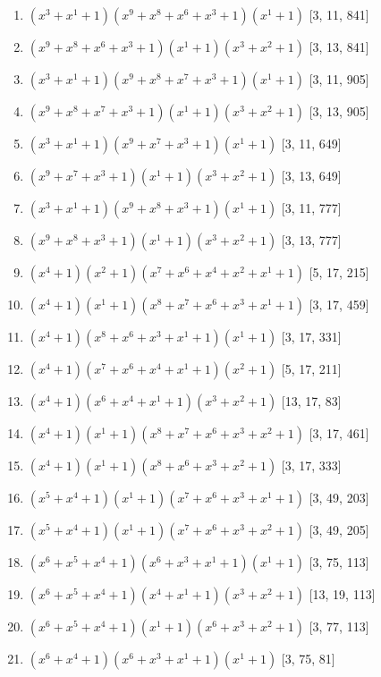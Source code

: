\documentclass[10pt,twocolumn]{article}
\begin{document}
\begin{enumerate}
\item $(x^{3} + x^{1} + 1)(x^{9} + x^{8} + x^{6} + x^{3} + 1)(x^{1} + 1)$  [3, 11, 841]
\item $(x^{9} + x^{8} + x^{6} + x^{3} + 1)(x^{1} + 1)(x^{3} + x^{2} + 1)$  [3, 13, 841]
\item $(x^{3} + x^{1} + 1)(x^{9} + x^{8} + x^{7} + x^{3} + 1)(x^{1} + 1)$  [3, 11, 905]
\item $(x^{9} + x^{8} + x^{7} + x^{3} + 1)(x^{1} + 1)(x^{3} + x^{2} + 1)$  [3, 13, 905]
\item $(x^{3} + x^{1} + 1)(x^{9} + x^{7} + x^{3} + 1)(x^{1} + 1)$  [3, 11, 649]
\item $(x^{9} + x^{7} + x^{3} + 1)(x^{1} + 1)(x^{3} + x^{2} + 1)$  [3, 13, 649]
\item $(x^{3} + x^{1} + 1)(x^{9} + x^{8} + x^{3} + 1)(x^{1} + 1)$  [3, 11, 777]
\item $(x^{9} + x^{8} + x^{3} + 1)(x^{1} + 1)(x^{3} + x^{2} + 1)$  [3, 13, 777]
\item $(x^{4} + 1)(x^{2} + 1)(x^{7} + x^{6} + x^{4} + x^{2} + x^{1} + 1)$  [5, 17, 215]
\item $(x^{4} + 1)(x^{1} + 1)(x^{8} + x^{7} + x^{6} + x^{3} + x^{1} + 1)$  [3, 17, 459]
\item $(x^{4} + 1)(x^{8} + x^{6} + x^{3} + x^{1} + 1)(x^{1} + 1)$  [3, 17, 331]
\item $(x^{4} + 1)(x^{7} + x^{6} + x^{4} + x^{1} + 1)(x^{2} + 1)$  [5, 17, 211]
\item $(x^{4} + 1)(x^{6} + x^{4} + x^{1} + 1)(x^{3} + x^{2} + 1)$  [13, 17, 83]
\item $(x^{4} + 1)(x^{1} + 1)(x^{8} + x^{7} + x^{6} + x^{3} + x^{2} + 1)$  [3, 17, 461]
\item $(x^{4} + 1)(x^{1} + 1)(x^{8} + x^{6} + x^{3} + x^{2} + 1)$  [3, 17, 333]
\item $(x^{5} + x^{4} + 1)(x^{1} + 1)(x^{7} + x^{6} + x^{3} + x^{1} + 1)$  [3, 49, 203]
\item $(x^{5} + x^{4} + 1)(x^{1} + 1)(x^{7} + x^{6} + x^{3} + x^{2} + 1)$  [3, 49, 205]
\item $(x^{6} + x^{5} + x^{4} + 1)(x^{6} + x^{3} + x^{1} + 1)(x^{1} + 1)$  [3, 75, 113]
\item $(x^{6} + x^{5} + x^{4} + 1)(x^{4} + x^{1} + 1)(x^{3} + x^{2} + 1)$  [13, 19, 113]
\item $(x^{6} + x^{5} + x^{4} + 1)(x^{1} + 1)(x^{6} + x^{3} + x^{2} + 1)$  [3, 77, 113]
\item $(x^{6} + x^{4} + 1)(x^{6} + x^{3} + x^{1} + 1)(x^{1} + 1)$  [3, 75, 81]

\end{enumerate}
\end{document}
